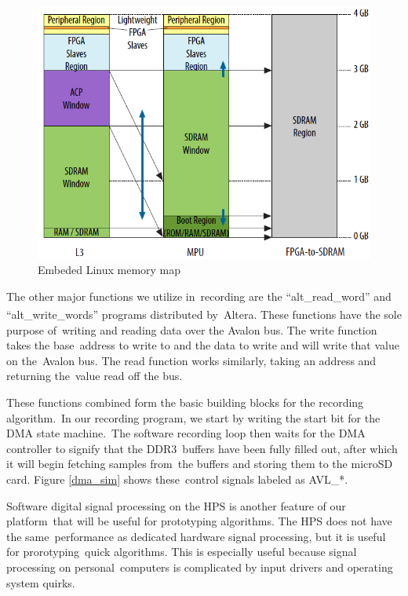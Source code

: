 \documentclass{article}
\begin{document}
\begin{figure}[ht]
	\begin{center}
	\includegraphics[scale=.38]{pictures/mmap.png}
	\caption{Embeded Linux memory map \cite{mmap}}
	\label{mmap}
	\end{center}
\end{figure}

The other major functions we utilize in\
recording are the ``alt\_read\_word'' and ``alt\_write\_words'' programs distributed by\
Altera\textsuperscript{\textregistered{}}. These functions have the sole purpose of\
writing and reading data over the Avalon bus. The write function takes the base\
address to write to and the data to write and will write that value on the\
Avalon bus. The read function works similarly, taking an address and returning the\
value read off the bus. 

These functions combined form the basic building blocks for the recording algorithm.\
In our recording program, we start by writing the start bit for the DMA state machine.\
The software recording loop then waits for the DMA controller to signify that the DDR3\
buffers have been fully filled out, after which it will begin fetching samples from\
the buffers and storing them to the microSD card. Figure \ref{dma_sim} shows these\
control signals labeled as AVL\_*.

Software digital signal processing on the HPS is another feature of our platform\
that will be useful for prototyping algorithms. The HPS does not have the same\
performance as dedicated hardware signal processing, but it is useful for prorotyping\
quick algorithms. This is especially useful because signal processing on personal\
computers is complicated by input drivers and operating system quirks.
\end{document}
